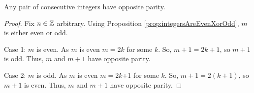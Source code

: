 \guard




\begin{prop}
\label{prop:integersAreEvenXorOdd}
  Any pair of consecutive integers have opposite parity.
\end{prop}
\begin{proof}
  Fix $n\in\mathbb{Z}$ arbitrary.
  Using Proposition \ref{prop:integersAreEvenXorOdd}, $m$ is either even or odd.

  Case 1: $m$ is even.
  As $m$ is even $m=2k$ for some $k$.
  So, $m+1 = 2k+1$, so $m+1$ is odd.
  Thus, $m$ and $m+1$ have opposite parity.


  Case 2: $m$ is odd.
  As $m$ is even $m=2k$+1 for some $k$.
  So, $m+1 = 2(k+1)$, so $m+1$ is even.
  Thus, $m$ and $m+1$ have opposite parity.
\end{proof}
